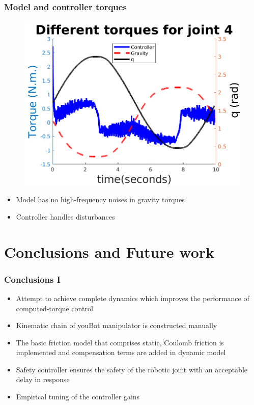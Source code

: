 \documentclass{beamer}
\begin{document}
\begin{frame}
	\frametitle{Model and controller torques}
		\centering
\begin{minipage}{.45\textwidth}
\begin{figure}
\centering
  \includegraphics[trim=0 0 0 0,width=1.2\linewidth]{images/joint4_ratio}
\end{figure}	
\end{minipage}
\hfill
\begin{minipage}{.45\textwidth}
\begin{itemize}
\item Model has no high-frequency noises in gravity torques
\item Controller handles disturbances
\end{itemize}
\end{minipage}
\end{frame}

\section{Conclusions and Future work}
\begin{frame}
	\frametitle{Conclusions I}
	\vspace{-0.3cm}
	\begin{itemize}
		\item Attempt to achieve complete dynamics which improves the performance of computed-torque control
		\item Kinematic chain of youBot manipulator is constructed manually
	\item The basic friction model that comprises static, Coulomb friction is implemented and compensation terms are added in dynamic model 
		\item Safety controller ensures the safety of the robotic joint with an acceptable delay in response
		\item Empirical tuning of the controller gains
	\end{itemize}
\end{frame}
\end{document}
